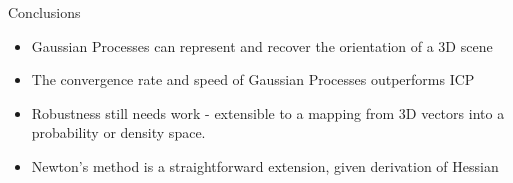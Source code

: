 \documentclass[final]{beamer}
\begin{document}
\begin{frame}{}
\begin{textblock}{27}
\begin{block}{Conclusions}
\begin{itemize}
\item Gaussian Processes can represent and recover the orientation of a 3D scene
\item The convergence rate and speed of Gaussian Processes outperforms ICP
\item Robustness still needs work - extensible to a mapping from 3D vectors into a probability or density space.
\item Newton's method is a straightforward extension, given derivation of Hessian
\end{itemize}
\end{block}


\end{textblock}

\end{frame}
\end{document}
